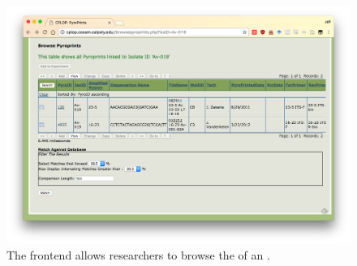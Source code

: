 \begin{figure}
    \centering
    \includegraphics[width=\frontendwidth]{figures/frontend/browse-isolate-pyroprints}
    \caption{The \cplop{} frontend allows researchers to browse the \pyros{} of an \isol{}.}
    \label{fig:browse-isolate-pyroprints}
\end{figure}